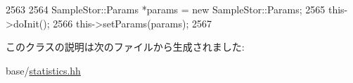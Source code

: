 \begin{DoxyCode}
2563     {
2564         SampleStor::Params *params = new SampleStor::Params;
2565         this->doInit();
2566         this->setParams(params);
2567     }
\end{DoxyCode}


このクラスの説明は次のファイルから生成されました:\begin{DoxyCompactItemize}
\item 
base/\hyperlink{statistics_8hh}{statistics.hh}\end{DoxyCompactItemize}

